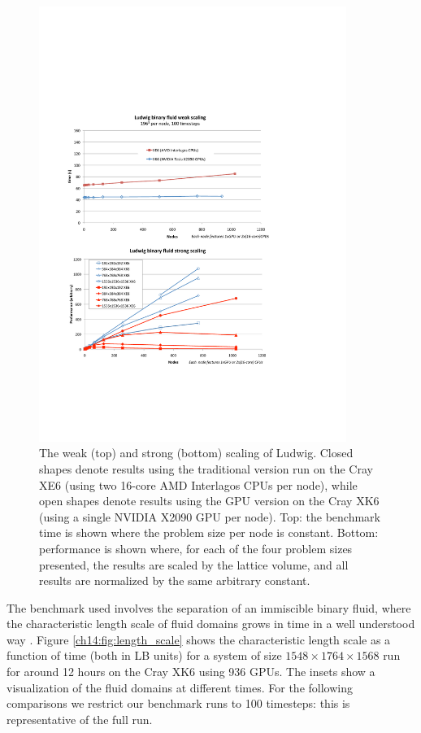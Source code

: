 \begin{figure}[!t]
\centering
\includegraphics[width=10cm]{Chapters/chapter14/figures/two_graphs_ud}
\caption{The weak (top) and strong (bottom) scaling of Ludwig.  Closed
  shapes denote results using the traditional version run on the Cray
  XE6 (using two 16-core AMD Interlagos CPUs per node), while open
  shapes denote results using the GPU version on the Cray XK6 (using a
  single NVIDIA X2090 GPU per node). Top: the benchmark time is shown
  where the problem size per node is constant. Bottom: performance is
  shown where, for each of the four problem sizes presented, the
  results are scaled by the lattice volume, and all results are
  normalized by the same arbitrary constant.  }
\label{ch14:fig:scaling}
\end{figure}

The benchmark used involves the separation of an immiscible binary
fluid, where the characteristic length scale of fluid domains grows in
time in a well understood way \cite{kendon2001}. Figure
\ref{ch14:fig:length_scale} shows the characteristic length scale as a
function of time (both in LB units) for a system of size $1548\times
1764\times 1568$ run for around 12 hours on the Cray XK6 using 936
GPUs. The insets show a visualization of the fluid domains at
different times.  For the following comparisons we restrict our
benchmark runs to 100 timesteps: this is representative of the full
run.


